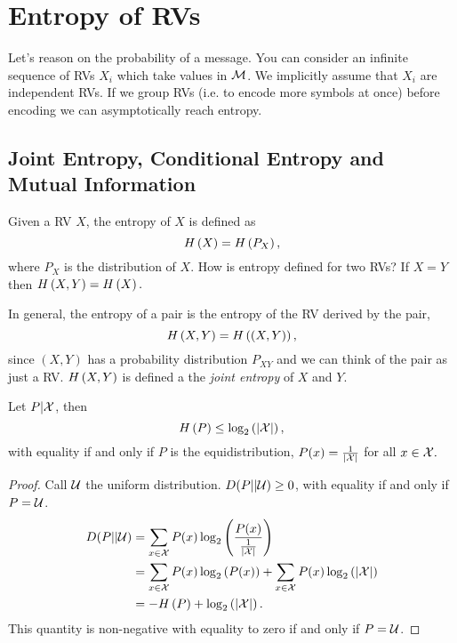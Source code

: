 
\chapter{Entropy of \aclp{RV}}

Let's reason on the probability of a message.
You can consider an infinite sequence of \acp{RV} $X_i$ which take values in $\mathcal{M}$.
We implicitly assume that $X_i$ are independent \acp{RV}.
If we group \acp{RV} (i.e. to encode more symbols at once) before encoding we can asymptotically reach entropy.

\section{Joint Entropy, Conditional Entropy and Mutual Information}

Given a \ac{RV} $X$, the entropy of $X$ is defined as
\begin{equation*}
	H\left({X}\right) = H\left({P_X}\right),
\end{equation*}
where $P_X$ is the distribution of $X$.
How is entropy defined for two \acp{RV}?
If $X = Y$ then $H\left({X,Y}\right) = H\left({X}\right).$

\begin{definition}
	In general, the entropy of a pair is the entropy of the \ac{RV} derived by the pair, \ie
	\begin{equation*}
		H\left({X,Y}\right) = H\left({(X,Y)}\right), 
	\end{equation*}
	since $(X, Y)$ has a probability distribution $P_{XY}$ and we can think of the pair as just a \ac{RV}.
	$H\left({X,Y}\right)$ is defined a the \emph{joint entropy} of $X$ and $Y$. 
\end{definition}

\begin{prop}
	Let $P | \mathcal{X}$, then
	\begin{equation*}
		H\left({P}\right) \le \log_2 \left( \left|{\mathcal{X}}\right| \right),
	\end{equation*}
	with equality if and only if $P$ is the equidistribution, \ie $P(x) = \frac{1}{\left|{\mathcal{X}}\right|}$ for all $x \in \mathcal{X}.$
\end{prop}

\begin{proof}
	Call $\mathcal{U}$ the uniform distribution.
	$D(P||\mathcal{U})\ge 0$, with equality if and only if $P = \mathcal{U}$.
	\begin{align*}
		D(P||\mathcal{U})
		& =
		\sum_{x \in \mathcal{X}} P(x) \log_2 \left( \frac{P(x)}{\frac{1}{\left|{\mathcal{X}}\right|}} \right)
		\\
		& =
		\sum_{x \in \mathcal{X}} P(x) \log_2 \left( P(x) \right)
		+
		\sum_{x \in \mathcal{X}} P(x) \log_2 \left( \left|{\mathcal{X}}\right| \right)
		\\
		& =
		-H\left({P}\right) + \log_2 \left( \left|{\mathcal{X}}\right| \right).
	\end{align*}
	This quantity is non-negative with equality to zero if and only if $P = \mathcal{U}$.
\end{proof}

